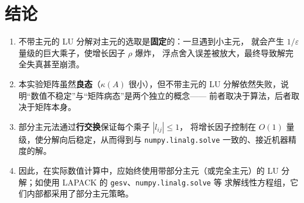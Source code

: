 \documentclass[12pt,a4paper]{ctexart}
\begin{document}
\section{结论}

\begin{enumerate}
  \item 不带主元的 LU 分解对主元的选取是\textbf{固定}的：一旦遇到小主元，
    就会产生 $1/\varepsilon$ 量级的巨大乘子，使增长因子 $\rho$ 爆炸，
    浮点舍入误差被放大，最终导致解完全失真甚至崩溃。
  \item 本实验矩阵虽然\textbf{良态}（$\kappa(A)$ 很小），但不带主元的
    LU 分解依然失败，说明“数值不稳定”与“矩阵病态”是两个独立的概念——
    前者取决于算法，后者取决于矩阵本身。
  \item 部分主元法通过\textbf{行交换}保证每个乘子 $|l_{ij}|\le 1$，
    将增长因子控制在 $O(1)$ 量级，使分解向后稳定，从而得到与
    \verb|numpy.linalg.solve| 一致的、接近机器精度的解。
  \item 因此，在实际数值计算中，应始终使用带部分主元（或完全主元）的
    LU 分解；如使用 LAPACK 的 \verb|gesv|、\verb|numpy.linalg.solve| 等
    求解线性方程组，它们内部都采用了部分主元策略。
\end{enumerate}
\end{document}
